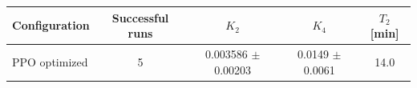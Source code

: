 \begin{tabular}{lcccc}
\toprule
Configuration & Successful runs & $K_2$ & $K_4$ & $T_2$ [min] \\
\midrule
PPO optimized & 5 & 0.003586 $\pm$ 0.00203 & 0.0149 $\pm$ 0.0061 & 14.0 \\
\bottomrule
\end{tabular}
